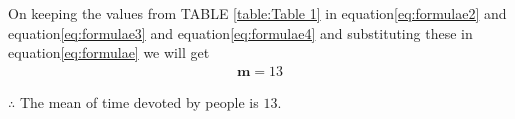 \documentclass[journal, 12pt, twocolumn]{IEEEtran}
\let\vec\mathbf
\begin{document}
On keeping the values from TABLE \ref{table:Table 1} in equation\eqref{eq:formulae2} and equation\eqref{eq:formulae3} and equation\eqref{eq:formulae4} and substituting these in equation\eqref{eq:formulae} we will get
\begin{align}
    \vec{m}=13
\end{align}

$\therefore$ The mean of time devoted by people is $13$.
\end{document}
